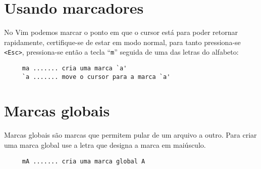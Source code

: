 \section{Usando marcadores}
\label{Usando marcadores}

No Vim podemos marcar o ponto em que o cursor está para poder retornar
rapidamente, certifique-se de estar em modo normal, para tanto pressiona-se \verb+<Esc>+,
pressiona-se então a tecla ``\verb+m+'' seguida de uma das letras do alfabeto:

\begin{verbatim}
     ma ....... cria uma marca `a'
     `a ....... move o cursor para a marca `a'
\end{verbatim}

\section{Marcas globais}
\label{Marcas globais}
Marcas globais são marcas que permitem pular de um arquivo a outro.
Para criar uma marca global use a letra que designa a marca em
maiúsculo.

\begin{verbatim}
     mA ....... cria uma marca global A
\end{verbatim}
